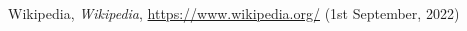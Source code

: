 \begin{thebibliography}{99}
\singlespace \normalsize

    Wikipedia, 
    \textit{Wikipedia}, \url{https://www.wikipedia.org/} 
    (1st September, 2022) 

\end{thebibliography}

